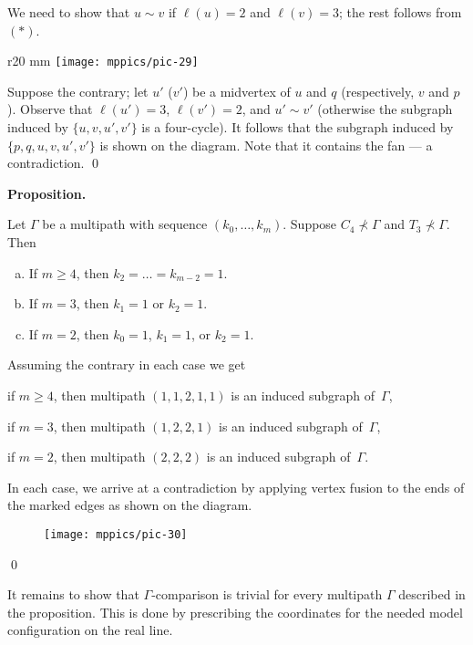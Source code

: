 \documentclass{article}
\def\parit#1{\medskip\noindent{\it #1}}
\def\qeds{\qed\par\medskip}
\def\qedsf{\vskip-6mm\qeds}
\newcounter{thm}[section]
\def\claim#1{\par\medskip\noindent\refstepcounter{thm}\hbox{\bf\boldmath #1.}
\it\ %
}
\def\endclaim{
\par\medskip}
\newenvironment{thm}{\claim}{\endclaim}
\begin{document}
\parit{Case $d=3$.}
We need to show that $u\sim v$ if $\ell(u)=2$ and $\ell(v)=3$;
the rest follows from $({*})$.

\begin{wrapfigure}{r}{20 mm}
\vskip-8mm
\centering
\texttt{[image: mppics/pic-29]}
\vskip-2mm
\end{wrapfigure}

Suppose the contrary;
let $u'$ ($v'$) be a midvertex of $u$ and $q$ (respectively, $v$ and $p$).
Observe that $\ell(u')=3$, $\ell(v')=2$, and $u'\sim v'$ (otherwise the subgraph induced by $\{u,v,u',v'\}$ is a four-cycle).
It follows that the subgraph induced by $\{p,q,u,v,u',v'\}$ is shown on the diagram.
Note that it contains the fan --- a contradiction. 
\qeds




\begin{thm}{Proposition}
Let $\Gamma$ be a multipath with sequence $(k_0,\dots, k_m)$.
Suppose $C_4\nprec\Gamma$ and  $T_3\nprec\Gamma$.
Then 
\begin{enumerate}[(a)]
 \item\label{lem:multipath:5} If $m\geqslant 4$, then $k_2=\dots=k_{m-2}=1$.
 \item\label{lem:multipath:4} If $m= 3$, then $k_1=1$ or $k_2=1$.
 \item\label{lem:multipath:3} If $m= 2$, then $k_0=1$, $k_1=1$, or $k_2=1$.
\end{enumerate}

\end{thm}

\parit{Proof.} Assuming the contrary in each case we get

\parit{(\ref{lem:multipath:5})}
if $m\geqslant 4$, then multipath $(1,1,2,1,1)$ is an induced subgraph of~$\Gamma$,

\parit{(\ref{lem:multipath:4})}
if $m=3$, then multipath $(1,2,2,1)$ is an induced subgraph of~$\Gamma$,

\parit{(\ref{lem:multipath:3})}
if $m=2$, then multipath $(2,2,2)$ is an induced subgraph of~$\Gamma$.

In each case, we arrive at a contradiction by applying vertex fusion to the ends of the marked edges as shown on the diagram.

\begin{figure}[h!]
\centering
\texttt{[image: mppics/pic-30]}
\end{figure}
\qedsf


It remains to show that $\Gamma$-comparison is trivial for every multipath $\Gamma$ described in the proposition.
This is done by prescribing the coordinates for the needed model configuration on the real line.
\end{document}
